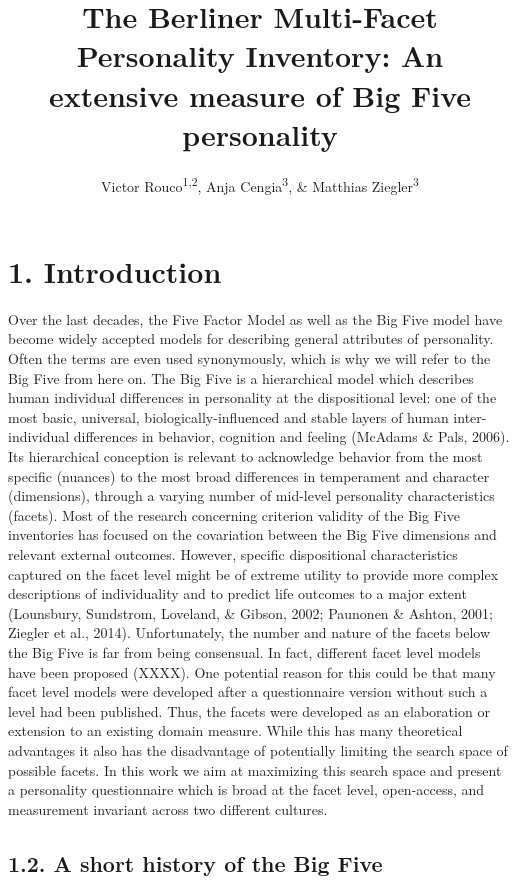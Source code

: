 \documentclass[,man,floatsintext]{apa6}
\title{The Berliner Multi-Facet Personality Inventory: An extensive measure of
Big Five personality}
\author{Victor Rouco\textsuperscript{1,2}, Anja Cengia\textsuperscript{3}, \&
Matthias Ziegler\textsuperscript{3}}
\date{}
\affiliation{
\vspace{0.5cm}
\textsuperscript{1} Universitat de Barcelona\\\textsuperscript{2} Institut de Neurociències de Barcelona\\\textsuperscript{3} Humboldt Universität zu Berlin}
\theoremstyle{definition}
\theoremstyle{definition}
\theoremstyle{definition}
\theoremstyle{remark}
\begin{document}
\maketitle

\hypertarget{introduction}{%
\section{1. Introduction}\label{introduction}}

Over the last decades, the Five Factor Model as well as the Big Five
model have become widely accepted models for describing general
attributes of personality. Often the terms are even used synonymously,
which is why we will refer to the Big Five from here on. The Big Five is
a hierarchical model which describes human individual differences in
personality at the dispositional level: one of the most basic,
universal, biologically-influenced and stable layers of human
inter-individual differences in behavior, cognition and feeling (McAdams
\& Pals, 2006). Its hierarchical conception is relevant to acknowledge
behavior from the most specific (nuances) to the most broad differences
in temperament and character (dimensions), through a varying number of
mid-level personality characteristics (facets). Most of the research
concerning criterion validity of the Big Five inventories has focused on
the covariation between the Big Five dimensions and relevant external
outcomes. However, specific dispositional characteristics captured on
the facet level might be of extreme utility to provide more complex
descriptions of individuality and to predict life outcomes to a major
extent (Lounsbury, Sundstrom, Loveland, \& Gibson, 2002; Paunonen \&
Ashton, 2001; Ziegler et al., 2014). Unfortunately, the number and
nature of the facets below the Big Five is far from being consensual. In
fact, different facet level models have been proposed (XXXX). One
potential reason for this could be that many facet level models were
developed after a questionnaire version without such a level had been
published. Thus, the facets were developed as an elaboration or
extension to an existing domain measure. While this has many theoretical
advantages it also has the disadvantage of potentially limiting the
search space of possible facets. In this work we aim at maximizing this
search space and present a personality questionnaire which is broad at
the facet level, open-access, and measurement invariant across two
different cultures.

\hypertarget{a-short-history-of-the-big-five}{%
\subsection{1.2. A short history of the Big
Five}\label{a-short-history-of-the-big-five}}
\end{document}
